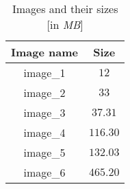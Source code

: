 \begin{table}[h]
\caption{Images and their sizes [in {\em MB}]}
\centering
\begin{tabular}{c c} 
\hline\hline
Image name & Size\\ [0.5ex] 
\hline 
image\_1 & $12$\\
image\_2 & $33$ \\
image\_3 & $37.31$ \\
image\_4 & $116.30$ \\
image\_5 & $132.03$\\ 
image\_6 & $465.20$\\
[1ex]
\hline
\end{tabular}
\label{table:sequ} 
\end{table}
